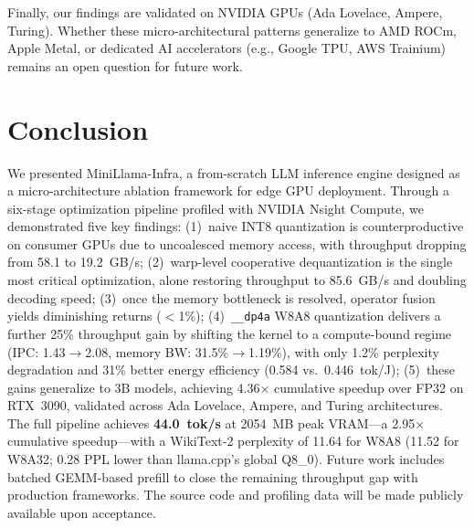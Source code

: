 \documentclass[conference]{IEEEtran}
\begin{document}
Finally, our findings are validated on NVIDIA GPUs (Ada Lovelace, Ampere, Turing). Whether these micro-architectural patterns generalize to AMD ROCm, Apple Metal, or dedicated AI accelerators (e.g., Google TPU, AWS Trainium) remains an open question for future work.

\section{Conclusion}

We presented MiniLlama-Infra, a from-scratch LLM inference engine designed as a micro-architecture ablation framework for edge GPU deployment. Through a six-stage optimization pipeline profiled with NVIDIA Nsight Compute, we demonstrated five key findings: (1)~naive INT8 quantization is counterproductive on consumer GPUs due to uncoalesced memory access, with throughput dropping from 58.1 to 19.2~GB/s; (2)~warp-level cooperative dequantization is the single most critical optimization, alone restoring throughput to 85.6~GB/s and doubling decoding speed; (3)~once the memory bottleneck is resolved, operator fusion yields diminishing returns ($<$1\%); (4)~\texttt{\_\_dp4a} W8A8 quantization delivers a further 25\% throughput gain by shifting the kernel to a compute-bound regime (IPC: 1.43$\to$2.08, memory BW: 31.5\%$\to$1.19\%), with only 1.2\% perplexity degradation and 31\% better energy efficiency (0.584 vs.\ 0.446~tok/J); (5)~these gains generalize to 3B models, achieving 4.36$\times$ cumulative speedup over FP32 on RTX~3090, validated across Ada Lovelace, Ampere, and Turing architectures. The full pipeline achieves \textbf{44.0~tok/s} at 2054~MB peak VRAM---a 2.95$\times$ cumulative speedup---with a WikiText-2 perplexity of 11.64 for W8A8 (11.52 for W8A32; 0.28 PPL lower than llama.cpp's global Q8\_0). Future work includes batched GEMM-based prefill to close the remaining throughput gap with production frameworks. The source code and profiling data will be made publicly available upon acceptance.
\end{document}
